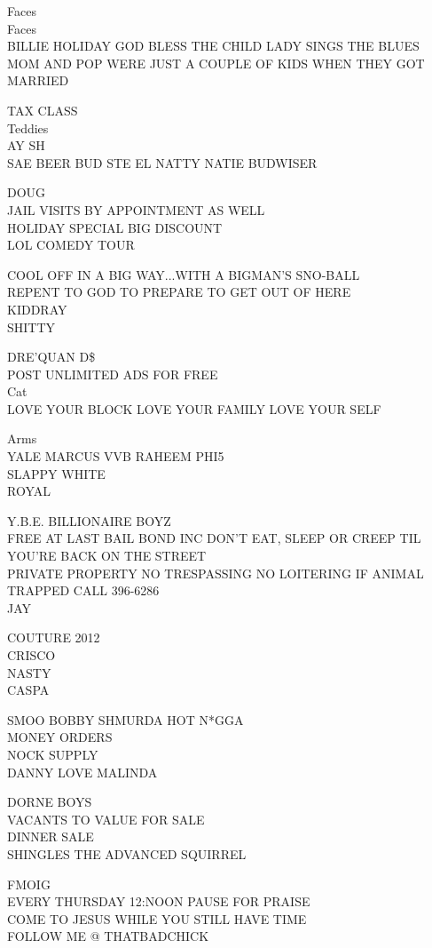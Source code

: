\documentclass[10pt,letterpaper]{article}
\begin{document}
Faces\\
Faces\\
BILLIE HOLIDAY GOD BLESS THE CHILD LADY SINGS THE BLUES\\
MOM AND POP WERE JUST A COUPLE OF KIDS WHEN THEY GOT MARRIED

TAX CLASS\\
Teddies\\
AY SH\\
SAE BEER BUD STE EL NATTY NATIE BUDWISER

DOUG\\
JAIL VISITS BY APPOINTMENT AS WELL\\
HOLIDAY SPECIAL BIG DISCOUNT\\
LOL COMEDY TOUR

COOL OFF IN A BIG WAY...WITH A BIGMAN'S SNO{-}BALL\\
REPENT TO GOD TO PREPARE TO GET OUT OF HERE\\
KIDDRAY\\
SHITTY

DRE'QUAN D\$\\
POST UNLIMITED ADS FOR FREE\\
Cat\\
LOVE YOUR BLOCK LOVE YOUR FAMILY LOVE YOUR SELF

Arms\\
YALE MARCUS VVB RAHEEM PHI5\\
SLAPPY WHITE\\
ROYAL

Y.B.E. BILLIONAIRE BOYZ\\
FREE AT LAST BAIL BOND INC DON'T EAT, SLEEP OR CREEP TIL YOU'RE BACK ON THE STREET\\
PRIVATE PROPERTY NO TRESPASSING NO LOITERING IF ANIMAL TRAPPED CALL 396{-}6286\\
JAY

COUTURE 2012\\
CRISCO\\
NASTY\\
CASPA

SMOO BOBBY SHMURDA HOT N*GGA\\
MONEY ORDERS\\
NOCK SUPPLY\\
DANNY LOVE MALINDA

DORNE BOYS\\
VACANTS TO VALUE FOR SALE\\
DINNER SALE\\
SHINGLES THE ADVANCED SQUIRREL

FMOIG\\
EVERY THURSDAY 12:NOON PAUSE FOR PRAISE\\
COME TO JESUS WHILE YOU STILL HAVE TIME\\
FOLLOW ME @ THATBADCHICK
\end{document}

